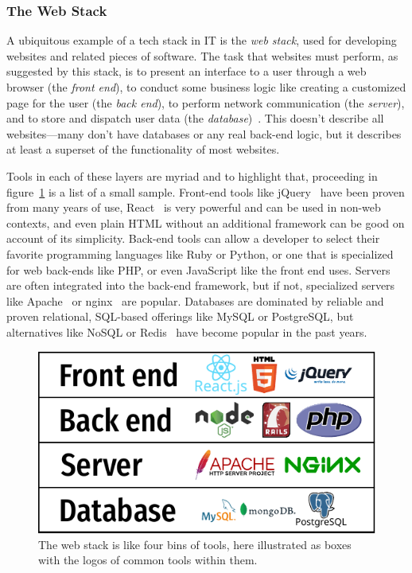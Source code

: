 \documentclass[english,12pt,a4paper,pdftex,eng,utf8]{aaltothesis}
\begin{document}
\subsubsection{The Web Stack}

A ubiquitous example of a tech stack in IT is the \textit{web stack}, used for developing websites and related pieces of software. The task that websites must perform, as suggested by this stack, is to present an interface to a user through a web browser (the \textit{front end}), to conduct some business logic like creating a customized page for the user (the \textit{back end}), to perform network communication (the \textit{server}), and to store and dispatch user data (the \textit{database})~\cite{PranamStack2017}. This doesn't describe all websites---many don't have databases or any real back-end logic, but it describes at least a superset of the functionality of most websites.

Tools in each of these layers are myriad and to highlight that, proceeding in figure~\ref{fig:web_stack} is a list of a small sample. Front-end tools like jQuery~\cite{jQuery} have been proven from many years of use, React~\cite{React} is very powerful and can be used in non-web contexts, and even plain HTML without an additional framework can be good on account of its simplicity. Back-end tools can allow a developer to select their favorite programming languages like Ruby or Python, or one that is specialized for web back-ends like PHP, or even JavaScript like the front end uses. Servers are often integrated into the back-end framework, but if not, specialized servers like Apache~\cite{ApacheServer} or nginx~\cite{nginx} are popular. Databases are dominated by reliable and proven relational, SQL-based offerings like MySQL or PostgreSQL, but alternatives like NoSQL or Redis~\cite{redis} have become popular in the past years.

\begin{figure}[h]
  \centering
  \includegraphics[width=\textwidth]{assets/web_stack}
  \caption{The web stack is like four bins of tools, here illustrated as boxes with the logos of common tools within them.}\label{fig:web_stack}
\end{figure}
\end{document}
